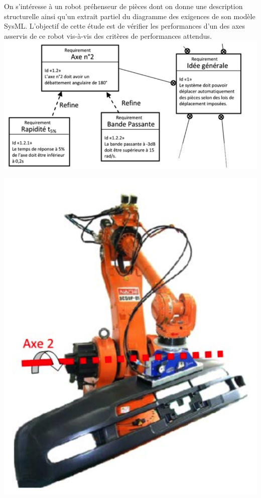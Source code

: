 \begin{minipage}{0.45\linewidth}
On s'intéresse à un robot préhenseur de pièces dont on donne une description structurelle ainsi qu'un extrait partiel du diagramme des exigences de son modèle SysML. L'objectif de cette étude est de vérifier les performances d'un des axes asservis de ce robot vis-à-vis des critères de performances attendus. \\
	\includegraphics[width=0.8\linewidth]{img/robot1}
\end{minipage}\hfill
\begin{minipage}{0.45\linewidth}
	\includegraphics[width=0.9\linewidth]{img/robot2}
\end{minipage}

